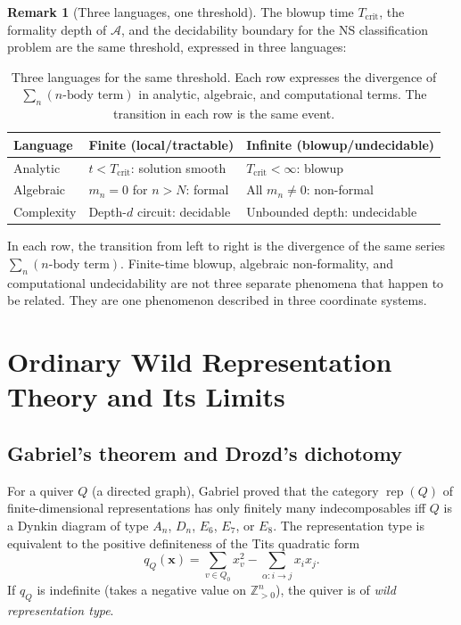 \documentclass[reqno,10pt]{amsart}
\theoremstyle{plain}
\theoremstyle{definition}
\newtheorem{remark}[theorem]{Remark}
\def\ZZ{{\mathbb{Z}}}
\begin{document}
\begin{remark}[Three languages, one threshold]
  The blowup time $T_{\mathrm{crit}}$, the formality depth of $\mathcal{A}$,
  and the decidability boundary for the NS classification problem are the
  same threshold, expressed in three languages:
  \begin{table}[H]
  \centering
  \renewcommand{\arraystretch}{1.4}
  \begin{tabular}{lll}
  \toprule
  Language & Finite (local/tractable) & Infinite (blowup/undecidable) \\
  \midrule
  Analytic & $t < T_{\mathrm{crit}}$: solution smooth & $T_{\mathrm{crit}} < \infty$: blowup \\
  Algebraic & $m_n = 0$ for $n > N$: formal & All $m_n \neq 0$: non-formal \\
  Complexity & Depth-$d$ circuit: decidable & Unbounded depth: undecidable \\
  \bottomrule
  \end{tabular}
  \caption{Three languages for the same threshold.  Each row expresses
  the divergence of $\sum_n (n\text{-body term})$ in analytic, algebraic,
  and computational terms.  The transition in each row is the same event.}
  \label{tab:triple}
  \end{table}
  In each row, the transition from left to right is the divergence of the
  same series $\sum_n (\text{$n$-body term})$.  Finite-time blowup, algebraic
  non-formality, and computational undecidability are not three separate
  phenomena that happen to be related.  They are one phenomenon described
  in three coordinate systems.
\end{remark}

\section{Ordinary Wild Representation Theory and Its Limits}\label{sec:wild}

\subsection{Gabriel's theorem and Drozd's dichotomy}

For a quiver $Q$ (a directed graph), Gabriel \cite{Gabriel1972} proved that
the category $\operatorname{rep}(Q)$ of finite-dimensional representations
has only finitely many indecomposables iff $Q$ is a Dynkin diagram of type
$A_n$, $D_n$, $E_6$, $E_7$, or $E_8$.  The representation type is
equivalent to the positive definiteness of the Tits quadratic form
\[
  q_Q(\mathbf{x}) = \sum_{v \in Q_0} x_v^2 - \sum_{\alpha: i \to j} x_i x_j.
\]
If $q_Q$ is indefinite (takes a negative value on $\ZZ_{>0}^n$), the quiver
is of \emph{wild representation type}.
\end{document}
